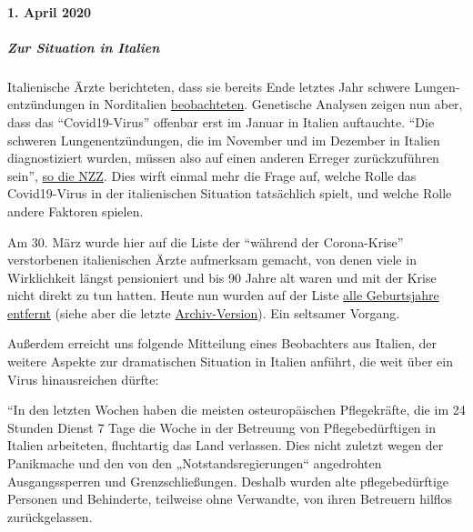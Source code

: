 \hypertarget{1-april-2020}{%
\paragraph{1. April 2020}\label{1-april-2020}}

\hypertarget{zur-situation-in-italien}{%
\subparagraph{\texorpdfstring{\textbf{Zur Situation in
Italien}}{Zur Situation in Italien}}\label{zur-situation-in-italien}}

Italienische Ärzte berichteten, dass sie bereits Ende letztes Jahr
schwere Lungen­ent­zündungen in Norditalien
\href{https://www.scmp.com/news/china/society/article/3076334/coronavirus-strange-pneumonia-seen-lombardy-november-leading}{beobachteten}.
Genetische Analysen zeigen nun aber, dass das ``Covid19-Virus'' offenbar
erst im Januar in Italien auftauchte. ``Die schweren
Lungen­ent­zündungen, die im November und im Dezember in Italien
diagnostiziert wurden, müssen also auf einen anderen Erreger
zurückzuführen sein'',
\href{https://www.nzz.ch/wissenschaft/coronavirus-der-stammbaum-verraet-woher-es-kommt-ld.1548271}{so
die NZZ}. Dies wirft einmal mehr die Frage auf, welche Rolle das
Covid19-Virus in der italienischen Situation tatsächlich spielt, und
welche Rolle andere Faktoren spielen.

Am 30. März wurde hier auf die Liste der ``während der Corona-Krise''
verstorbenen italienischen Ärzte aufmerksam gemacht, von denen viele in
Wirklichkeit längst pensioniert und bis 90 Jahre alt waren und mit der
Krise nicht direkt zu tun hatten. Heute nun wurden auf der Liste
\href{https://portale.fnomceo.it/elenco-dei-medici-caduti-nel-corso-dellepidemia-di-covid-19/}{alle
Geburts­jahr­e entfernt} (siehe aber die letzte
\href{https://web.archive.org/web/20200328152430/https://portale.fnomceo.it/elenco-dei-medici-caduti-nel-corso-dellepidemia-di-covid-19/}{Archiv-Version}).
Ein seltsamer Vorgang.

Außerdem erreicht uns folgende Mitteilung eines Beobachters aus Italien,
der weitere Aspekte zur dramatischen Situation in Italien anführt, die
weit über ein Virus hinausreichen dürfte:

``In den letzten Wochen haben die meisten osteuropäischen Pflegekräfte,
die im 24 Stunden Dienst 7 Tage die Woche in der Betreuung von
Pflegebedürftigen in Italien arbeiteten, fluchtartig das Land verlassen.
Dies nicht zuletzt wegen der Panikmache und den von den
„Notstandsregierungen`` angedrohten Ausgangssperren und
Grenzschließungen. Deshalb wurden alte pflegebedürftige Personen und
Behinderte, teilweise ohne Verwandte, von ihren Betreuern hilflos
zurückgelassen.

